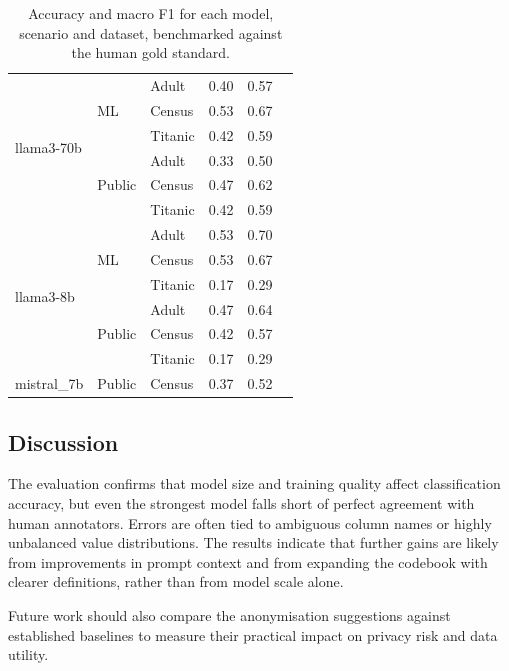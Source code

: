 \documentclass{article}
\begin{document}
\begin{table}[h]
\begin{tabular}{lllccl}
\midrule
\multirow{6}{*}{llama3-70b} & \multirow{3}{*}{ML} & Adult & 0.40 & 0.57 \\
                            &                     & Census & 0.53 & 0.67 \\
                            &                     & Titanic & 0.42 & 0.59 \\
                            & \multirow{3}{*}{Public} & Adult & 0.33 & 0.50 \\
                            &                          & Census & 0.47 & 0.62 \\
                            &                          & Titanic & 0.42 & 0.59 \\
\midrule
\multirow{6}{*}{llama3-8b} & \multirow{3}{*}{ML} & Adult & 0.53 & 0.70 \\
                           &                     & Census & 0.53 & 0.67 \\
                           &                     & Titanic & 0.17 & 0.29 \\
                           & \multirow{3}{*}{Public} & Adult & 0.47 & 0.64 \\
                           &                          & Census & 0.42 & 0.57 \\
                           &                          & Titanic & 0.17 & 0.29 \\
\midrule
mistral\_7b & Public & Census & 0.37 & 0.52 \\
\bottomrule
\end{tabular}
\caption{Accuracy and macro F1 for each model, scenario and dataset, benchmarked against the human gold standard.}
\label{tab:llm_eval_grouped}
\end{table}

\subsection{Discussion}

The evaluation confirms that model size and training quality affect classification accuracy, but even the strongest model falls short of perfect agreement with human annotators.  
Errors are often tied to ambiguous column names or highly unbalanced value distributions.  
The results indicate that further gains are likely from improvements in prompt context and from expanding the codebook with clearer definitions, rather than from model scale alone.

Future work should also compare the anonymisation suggestions against established baselines to measure their practical impact on privacy risk and data utility.
\end{document}
